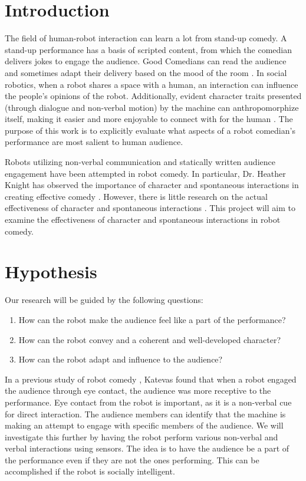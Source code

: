 \documentclass[onecolumn, draftclsnofoot,10pt, compsoc]{IEEEtran}
\begin{document}
\section{Introduction}
The field of human-robot interaction can learn a lot from stand-up comedy. A stand-up performance has a basis of scripted content, from which the comedian delivers jokes to engage the audience. Good Comedians can read the audience and sometimes adapt their delivery based on the mood of the room \cite{talkingFunny}. In social robotics, when a robot shares a space with a human, an interaction can influence the people's opinions of the robot. Additionally, evident character traits presented (through dialogue and non-verbal motion) by the machine can anthropomorphize itself, making it easier and more enjoyable to connect with for the human \cite{KnightEightLessons:2011}. The purpose of this work is to explicitly evaluate what aspects of a robot comedian's performance are most salient to human audience.

Robots utilizing non-verbal communication and statically written audience engagement have been attempted in robot comedy. In particular, Dr. Heather Knight has observed the importance of character and spontaneous interactions in creating effective comedy \cite{KnightEightLessons:2011}. However, there is little research on the actual effectiveness of character and spontaneous interactions \cite{KatevasRobot:2014}. This project will aim to examine the effectiveness of character and spontaneous interactions in robot comedy.


\section{Hypothesis}

Our research will be guided by the following questions:
\begin{enumerate}[\IEEEsetlabelwidth{6)}]
\item How can the robot make the audience feel like a part of the performance?
\item How can the robot convey and a coherent and well-developed character?
\item How can the robot adapt and influence to the audience?
\end{enumerate}

In a previous study of robot comedy \cite{RobotComedyLab:2015}, Katevas found that when a robot engaged the audience through eye contact, the audience was more receptive to the performance. Eye contact from the robot is important, as it is a non-verbal cue for direct interaction. The audience members can identify that the machine is making an attempt to engage with specific members of the audience. We will investigate this further by having the robot perform various non-verbal and verbal interactions using sensors. The idea is to have the audience be a part of the performance even if they are not the ones performing. This can be accomplished if the robot is socially intelligent.
\end{document}
